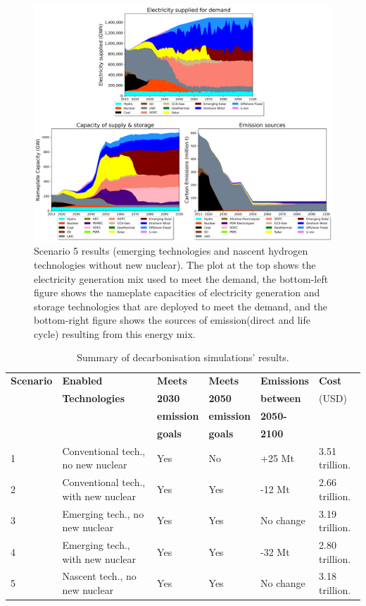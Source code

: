 \begin{figure}[b!] 
\centering
\includegraphics[scale=0.5]{figures/lowtrltech_nonuc}
\caption{Scenario 5 results (emerging technologies and nascent hydrogen technologies without new nuclear). The plot at the top shows the electricity generation mix used to meet the demand, the bottom-left figure shows the nameplate capacities of electricity generation and storage technologies that are deployed to meet the demand, and the bottom-right figure shows the sources of emission(direct and life cycle) resulting from this energy mix.}
\label{scen5}
\end{figure}

\begin{table}[!ht]
\centering
	\caption{Summary of decarbonisation simulations' results.}
	\vspace{0.1in}
	\begin{tabularx}{0.9\textwidth}{p{} p{}p{}p{}p{}p{}}
		\hline
\textbf{Scenario} & \textbf{Enabled} & \textbf{Meets} & \textbf{Meets} & \textbf{Emissions} & \textbf{Cost} \\
 & \textbf{Technologies} & \textbf{2030} & \textbf{2050} & \textbf{between} & (USD) \\
 &  & \textbf{emission} & \textbf{emission} & \textbf{2050-} &  \\
 &  & \textbf{goals} & \textbf{goals} & \textbf{2100} &  \\
\hline
1 & Conventional tech., no new nuclear & Yes & No & +25 Mt & 3.51 trillion. \\
2 & Conventional tech., with new nuclear & Yes & Yes & -12 Mt & 2.66 trillion. \\
3 & Emerging tech., no new nuclear & Yes & Yes & No change & 3.19 trillion. \\
4 & Emerging tech., with new nuclear & Yes & Yes & -32 Mt & 2.80 trillion. \\
5 & Nascent tech., no new nuclear & Yes & Yes & No change & 3.18 trillion. \\
\hline 
	\end{tabularx}
\label{tab:results_summary}
\end{table}

